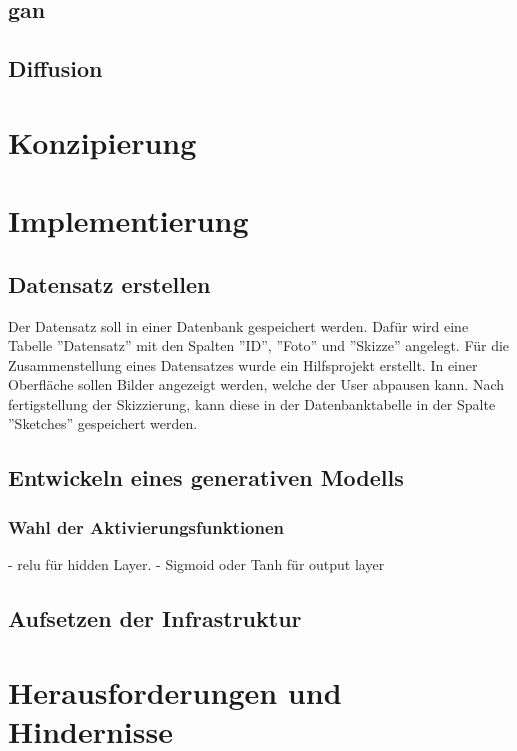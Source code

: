 \documentclass[12pt,a4paper]{article}
\begin{document}
	\subsection{\ac{gan}}

	\subsection{Diffusion}

\newpage
\section{Konzipierung}

\newpage
\section{Implementierung}

	\subsection{Datensatz erstellen}
		Der Datensatz soll in einer Datenbank gespeichert werden.
		Dafür wird eine Tabelle ''Datensatz'' mit den Spalten ''ID'', ''Foto'' und ''Skizze'' angelegt.
		Für die Zusammenstellung eines Datensatzes wurde ein Hilfsprojekt erstellt.
		In einer Oberfläche sollen Bilder angezeigt werden, welche der User abpausen kann.
		Nach fertigstellung der Skizzierung, kann diese in der Datenbanktabelle in der Spalte ''Sketches'' gespeichert werden.

	\subsection{Entwickeln eines generativen Modells}

		\subsubsection{Wahl der Aktivierungsfunktionen}
			- relu für hidden Layer.
			- Sigmoid oder Tanh für output layer
		
	\subsection{Aufsetzen der Infrastruktur}

\newpage
\section{Herausforderungen und Hindernisse}
\end{document}
